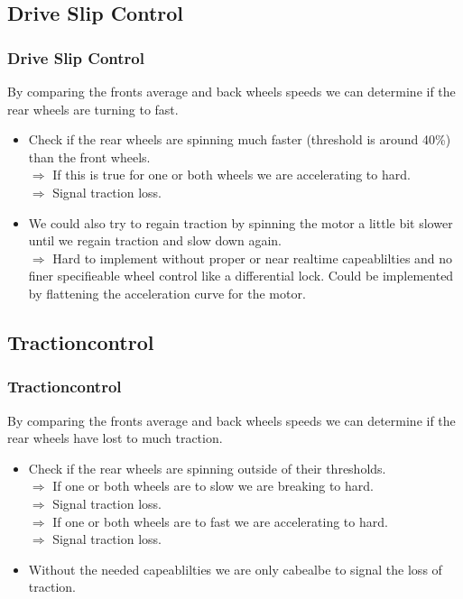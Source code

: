 \documentclass{beamer}
\begin{document}
\subsection{Drive Slip Control}
\begin{frame}
    \frametitle{Drive Slip Control}
    By comparing the fronts average and back wheels speeds we can determine if the rear wheels are turning to fast. 
    \begin{itemize}
     \item Check if the rear wheels are spinning much faster (threshold is around 40\%) than the front wheels.\\
     $\Rightarrow$ If this is true for one or both wheels we are accelerating to hard.\\
     $\Rightarrow$ Signal traction loss.
     \pause
     \item We could also try to regain traction by spinning the motor a little bit slower until we regain traction and slow down again.\\
     $\Rightarrow$ Hard to implement without proper or near realtime capeablilties and no finer specifieable wheel control like a differential lock. Could be implemented by flattening the acceleration curve for the motor. \\
     \pause
    \end{itemize}
\end{frame}
\subsection{Tractioncontrol}
\begin{frame}
    \frametitle{Tractioncontrol}
    By comparing the fronts average and back wheels speeds we can determine if the rear wheels have lost to much traction.
    \begin{itemize}
     \item Check if the rear wheels are spinning outside of their thresholds.\\
     $\Rightarrow$ If one or both wheels are to slow we are breaking to hard.\\
     $\Rightarrow$ Signal traction loss.\\
     $\Rightarrow$ If one or both wheels are to fast we are accelerating to hard.\\
     $\Rightarrow$ Signal traction loss.
     \pause
     \item Without the needed capeablilties we are only cabealbe to signal the loss of traction.
     \pause
    \end{itemize}
\end{frame}
\end{document}
